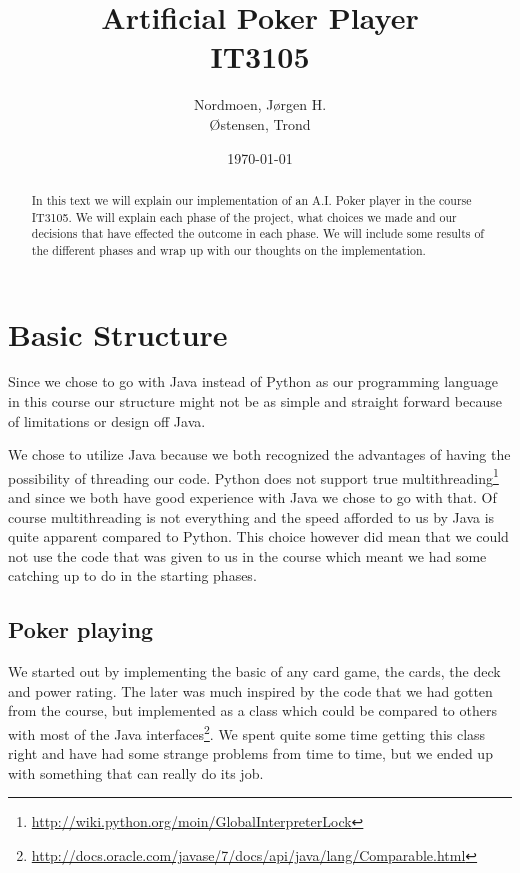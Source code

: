 \documentclass[titlepage, a4paper]{article}
\title{
	Artificial Poker Player \\
	IT3105 \\
}
\author{
	Nordmoen, Jørgen H. \\
	Østensen, Trond
}
\date{\today}
\begin{document}
\maketitle

\begin{abstract}\label{abstract}
In this text we will explain our implementation of an A.I. Poker player in the course
IT3105. We will explain each phase of the project, what choices we made and our decisions
that have effected the outcome in each phase. We will include some results of the different
phases and wrap up with our thoughts on the implementation.
\end{abstract}

\newpage
\tableofcontents


\section{Basic Structure}\label{basic}
Since we chose to go with Java instead of Python as our programming language in this course
our structure might not be as simple and straight forward because of limitations or design
off Java.

We chose to utilize Java because we both recognized the advantages of having the possibility
of threading our code. Python does not support true multithreading\footnote{\url{http://wiki.python.org/moin/GlobalInterpreterLock}} and since we both have good experience with Java we chose to go with that.
Of course multithreading is not everything and the speed afforded to us by Java is quite
apparent compared to Python. This choice however did mean that we could not use the code that
was given to us in the course which meant we had some catching up to do in the starting phases.

\subsection{Poker playing}\label{poker playing}
We started out by implementing the basic of any card game, the cards, the deck and power rating.
The later was much inspired by the code that we had gotten from the course, but implemented as
a class which could be compared to others with most of the Java interfaces\footnote{\url{http://docs.oracle.com/javase/7/docs/api/java/lang/Comparable.html}}. We spent quite
some time getting this class right and have had some strange problems from time to time, but
we ended up with something that can really do its job. 
\end{document}
